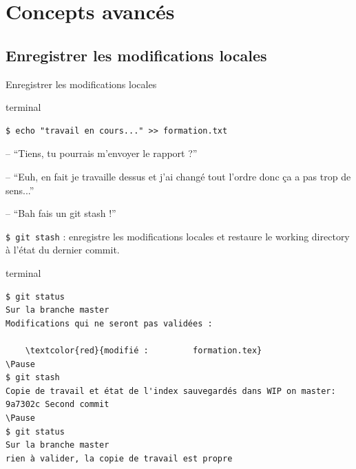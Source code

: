 \documentclass[usepdftitle=false]{beamer}
\def\seplength{.3\topsep}
\newcommand{\Pause}{%
\ifdef{\Release}
  {\pause}
  {}
}
\begin{document}
\section{Concepts avancés}

\subsection{Enregistrer les modifications locales}

\begin{frame}[fragile]{Enregistrer les modifications locales}

	\begin{beamercolorbox}[rounded=true,shadow=true]{terminal}
\vspace{-\seplength}
\begin{Verbatim}
$ echo "travail en cours..." >> formation.txt
\end{Verbatim}
	\end{beamercolorbox}

	\Pause

	\begin{block}{}
		-- \enquote{Tiens, tu pourrais m'envoyer le rapport ?} \\
		\Pause
		-- \enquote{Euh, en fait je travaille dessus et j'ai changé tout l'ordre donc ça a pas trop de sens...} \\
		\Pause
		-- \enquote{Bah fais un git stash !}
	\end{block}

	\verb+$ git stash+ : enregistre les modifications locales et restaure le working directory à l'état du dernier commit.

	\begin{beamercolorbox}[rounded=true,shadow=true]{terminal}
\vspace{-\seplength}
	\begin{Verbatim}
$ git status
Sur la branche master
Modifications qui ne seront pas validées :

	\textcolor{red}{modifié :         formation.tex}
\Pause
$ git stash
Copie de travail et état de l'index sauvegardés dans WIP on master: 9a7302c Second commit
\Pause
$ git status
Sur la branche master
rien à valider, la copie de travail est propre
\end{Verbatim}
	\end{beamercolorbox}
\end{frame}
\end{document}
